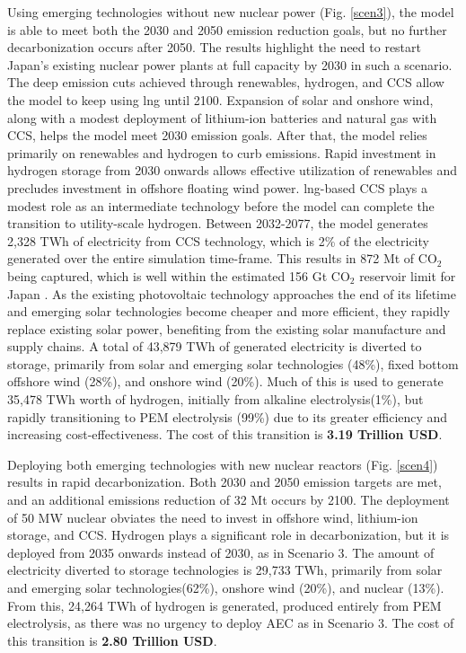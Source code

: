 Using emerging technologies without new nuclear power (Fig. \ref{scen3}), the model is able to meet both the 2030 and 2050 emission reduction goals, but no further decarbonization occurs after 2050. The results highlight the need to restart Japan's existing nuclear power plants at full capacity by 2030 in such a scenario. The deep emission cuts achieved through renewables, hydrogen, and \gls{CCS} allow the model to keep using \gls{lng} until 2100. Expansion of solar and onshore wind, along with a modest deployment of lithium-ion batteries and natural gas with \gls{CCS}, helps the model meet 2030 emission goals. After that, the model relies primarily on renewables and hydrogen to curb emissions. Rapid investment in hydrogen storage from 2030 onwards allows effective utilization of renewables and precludes investment in offshore floating wind power. \gls{lng}-based \gls{CCS} plays a modest role as an intermediate technology before the model can complete the transition to utility-scale hydrogen. Between 2032-2077, the model generates 2,328 TWh  of electricity from \gls{CCS} technology, which is 2\% of the electricity generated over the entire simulation time-frame. This results in 872 Mt of CO$_2$ being captured, which is well within the estimated 156 Gt CO$_2$ reservoir limit for Japan \cite{kato_energy_2016}. As the existing photovoltaic technology approaches the end of its lifetime and emerging solar technologies become cheaper and more efficient, they rapidly replace existing solar power, benefiting from the existing solar manufacture and supply chains. A total of 43,879 TWh of generated electricity is diverted to storage, primarily from solar and emerging solar technologies (48\%), fixed bottom offshore wind (28\%), and onshore wind (20\%). Much of this is used to generate 35,478 TWh worth of hydrogen, initially from alkaline electrolysis(1\%), but rapidly transitioning to PEM electrolysis (99\%) due to its greater efficiency and increasing cost-effectiveness. The cost of this transition is \textbf{3.19 Trillion USD}.

Deploying both emerging technologies with new nuclear reactors (Fig. \ref{scen4}) results in rapid decarbonization. Both 2030 and 2050 emission targets are met, and an additional emissions reduction of 32 Mt occurs by 2100. The deployment of 50 MW nuclear obviates the need to invest in offshore wind, lithium-ion storage, and \gls{CCS}. Hydrogen plays a significant role in decarbonization, but it is deployed from 2035 onwards instead of 2030, as in Scenario 3. The amount of electricity diverted to storage technologies is 29,733 TWh, primarily from solar and emerging solar technologies(62\%), onshore wind (20\%), and nuclear (13\%). From this, 24,264 TWh of hydrogen is generated, produced entirely from PEM electrolysis, as there was no urgency to deploy \gls{AEC} as in Scenario 3. The cost of this transition is \textbf{2.80 Trillion USD}.

